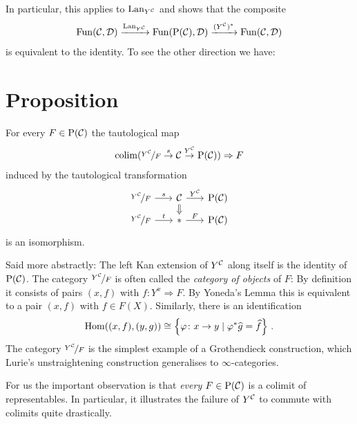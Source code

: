         In particular, this applies to $\operatorname{Lan}_{Y^{\mathcal{C}}}$ and shows that the composite
        \begin{equation*}
            \operatorname{Fun}(\mathcal{C}, \mathcal{D}) \xrightarrow{\operatorname{Lan}_{Y^{\mathcal{C}}}} \operatorname{Fun}(\mathrm{P}(\mathcal{C}), \mathcal{D}) \xrightarrow{(Y^{\mathcal{C}})^*} \operatorname{Fun}(\mathcal{C}, \mathcal{D})
        \end{equation*}
        is equivalent to the identity. To see the other direction we have:
    \section{Proposition}
        For every $F \in \mathrm{P}(\mathcal{C})$ the tautological map
        \begin{equation*}
            \operatorname*{colim}(\nicefrac{Y^{\mathcal{C}}}{F} \overset{s}{\rightarrow} \mathcal{C} \overset{Y^{\mathcal{C}}}{\rightarrow} \mathrm{P}(\mathcal{C})) \Rightarrow F
        \end{equation*}
        induced by the tautological transformation
        \begin{equation*}
            \begin{tikzcd}[column sep=scriptsize, row sep=tiny]
                \nicefrac{Y^{\Cc}}{F} \arrow[r, "s"] & \Cc \arrow[r, "Y^{\Cc}"] \arrow[d, Rightarrow] & \mathrm{P}(\Cc) \\
                \nicefrac{Y^{\Cc}}{F} \arrow[r, "t"] & * \arrow[r, "F"]                               & \mathrm{P}(\Cc)
            \end{tikzcd}
        \end{equation*}
        is an isomorphism.

        Said more abstractly: The left Kan extension of $Y^{\mathcal{C}}$ along itself is the identity of $\mathrm{P}(\mathcal{C})$. The category $\nicefrac{Y^{\mathcal{C}}}{F}$ is often called the \emph{category of objects} of $F$: By definition it consists of pairs $(x, f)$ with $f \colon Y^x \Rightarrow F$. By Yoneda's Lemma this is equivalent to a pair $(x, f)$ with $f \in F(X)$. Similarly, there is an identification
        \begin{equation*}
            \operatorname{Hom}((x, f), (y, g)) \cong \left\{ \varphi \colon x \to y \mid \varphi^* \widehat{g} = \widehat{f} \right\} \,.
        \end{equation*}
        The category $\nicefrac{Y^{\mathcal{C}}}{F}$ is the simplest example of a Grothendieck construction, which Lurie's unstraightening construction generalises to $\infty$-categories.

        For us the important observation is that \emph{every} $F \in \mathrm{P}(\mathcal{C})$ is a  colimit of representables. In particular, it illustrates the failure of $Y^{\mathcal{C}}$ to commute with colimits quite drastically.
        \smallskip

